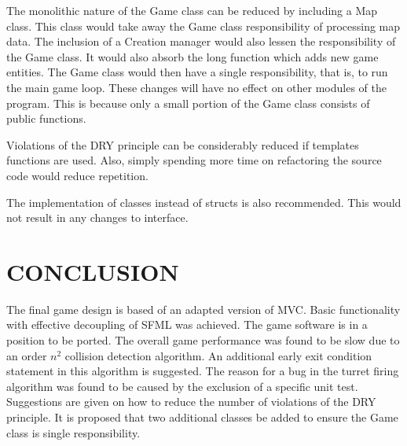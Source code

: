 \documentclass[10pt,twocolumn]{witseiepaper}
\begin{document}
The monolithic nature of the Game class can be reduced by including a Map class. This class would take away the Game class responsibility of processing map data.  The inclusion of a Creation manager would also lessen the responsibility of the Game class. It would also absorb the long function which adds new game entities.  The Game class would then have a single responsibility, that is, to run the main game loop. These changes will have no effect on other modules of the program. This is because only a small portion of the Game class consists of public functions.

Violations of the DRY principle can be considerably reduced if templates functions are used. Also, simply spending more time on refactoring the source code would reduce repetition. 

The implementation of classes instead of structs is also recommended. This would not result in any changes to interface.

%
\section{CONCLUSION} 
The final game design is based of an adapted version of MVC. Basic functionality with effective decoupling of SFML was achieved. The game software is in a position to be ported. The overall game performance was found to be slow due to an order $ n^{2} $ collision detection algorithm. An additional early exit condition statement in this algorithm is suggested. The reason for a bug in the turret firing algorithm was found to be caused by the exclusion of a specific unit test. Suggestions are given on how to reduce the number of violations of the DRY principle. It is proposed that two additional classes be added to ensure the Game class is single responsibility.

\balance

%


\end{document}
